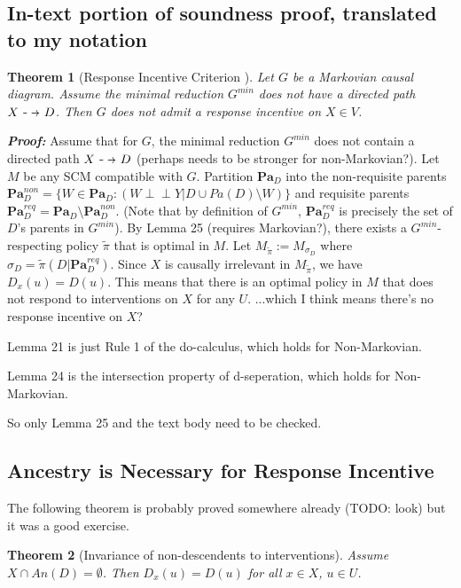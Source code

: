 \documentclass[letterpaper,10pt]{article}
\newtheorem{theorem}{Theorem}
\newcommand\dashto{\mathrel{
  -\mkern-6mu{\to}\mkern-20mu{\color{white}\bullet}\mkern12mu
}}
\newcommand\indep{\perp \!\!\! \perp}
\begin{document}
\subsection{In-text portion of soundness proof, translated to my notation}

\begin{theorem}[Response Incentive Criterion \cite{everitt2021agent}]\label{markov}
Let $G$ be a Markovian causal diagram. Assume the minimal reduction $G^{min}$ does not have a directed path $X\dashto D$.
Then $G$ does not admit a response incentive on $X\in V$.
\end{theorem}

\textbf{\emph{Proof:}}
Assume that for $G$, the minimal reduction $G^{min}$ does not contain a directed path $X\dashto D$ \color{red} (perhaps needs to be stronger for non-Markovian?)\color{black}. 
Let $M$ be any SCM compatible with $G$. 
Partition $\mathbf{Pa}_D$ into the non-requisite parents $\mathbf{Pa}^{non}_D=\{W\in \mathbf{Pa}_D : (W\indep Y | D \cup Pa(D) \setminus W)\}$ and requisite parents $\mathbf{Pa}_D^{req}=\mathbf{Pa}_D\setminus\mathbf{Pa}^{non}_D$.
(Note that by definition of $G^{min}$, $\mathbf{Pa}_D^{req}$ is precisely the set of $D$'s parents in $G^{min}$).
By Lemma 25 \color{red} (requires Markovian?)\color{black}, there exists a $G^{min}$-respecting policy $\tilde{\pi}$ that is optimal in $M$. 
Let $M_{\tilde{\pi}}:=M_{\sigma_D}$ where $\sigma_D = \tilde{\pi} (D|\mathbf{Pa}^{req}_D)$.
Since $X$ is causally irrelevant in $M_{\tilde{\pi}}$, we have $D_x(u) = D(u)$. 
This means that there is an optimal policy in $M$ that does not respond to interventions on $X$ for any $U$.
\color{red} ...which I think means there's no response incentive on $X$? \color{black}

Lemma 21 is just Rule 1 of the do-calculus, which holds for Non-Markovian.

Lemma 24 is the intersection property of d-seperation, which holds for Non-Markovian.

So only Lemma 25 and the text body need to be checked.


\subsection{Ancestry is Necessary for Response Incentive}
The following theorem is probably proved somewhere already \color{red} (TODO: look) \color{black} but it was a good exercise.

\begin{theorem}[Invariance of non-descendents to interventions]\label{invariance}
Assume $X\cap An(D)=\emptyset$. Then $D_x(u)=D(u)$ for all $x\in X$, $u\in U$.
\end{theorem}
\end{document}

